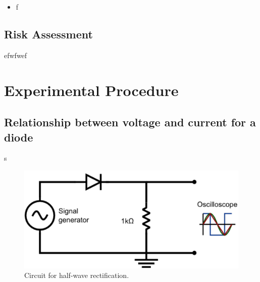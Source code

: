 \documentclass[12pt]{article}
\begin{document}
\begin{multicols}{2}
\begin{itemize}
	\item f
\end{itemize}
\end{multicols}


\subsection{Risk Assessment}

efwfwef


\section{Experimental Procedure}


\subsection{Relationship between voltage and current for a diode}

s

\begin{figure}[h]
\centering
\includegraphics[scale=0.35]{Half_Wave_Retification.png}
\caption{Circuit for half-wave rectification.}
\label{SymbolHalfWaveRet}
\end{figure}
\end{document}
